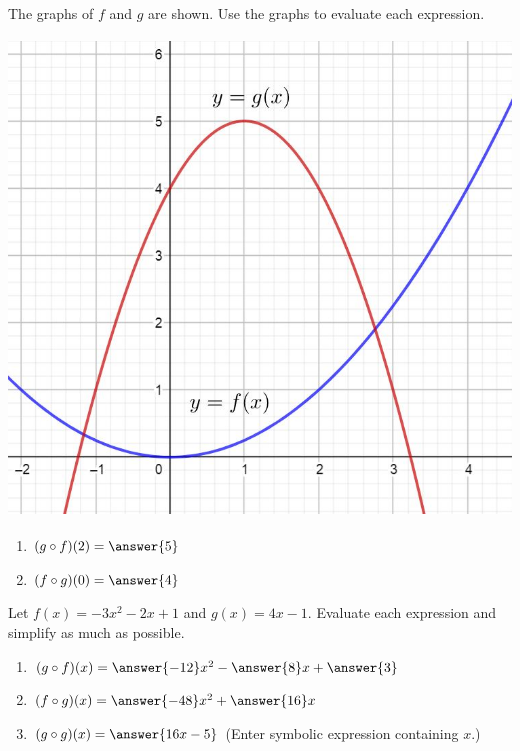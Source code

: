 \documentclass{ximera}
\begin{document}
\begin{problem}\label{prob:160hom2prob7}
The graphs of $f$ and $g$ are shown.  Use the graphs to evaluate each expression.
\begin{image}
   \includegraphics[height=5in]{160H2pic8.jpg}
 \end{image}
  \begin{enumerate}
\item
$(g\circ f)(2)=\answer{5}$

\item
$(f\circ g)(0)=\answer{4}$

  \end{enumerate}
\end{problem}
\begin{problem}\label{prob:160hom2prob8}
Let $f(x)=-3x^2-2x+1$ and $g(x)=4x-1$.  Evaluate each expression and simplify as much as possible.
\begin{enumerate}
    \item $(g\circ f)(x)=\answer{-12}x^2-\answer{8}x+\answer{3}$
    \item $(f\circ g)(x)=\answer{-48}x^2+\answer{16}x$
    \item $(g\circ g)(x)=\answer{16x-5}$ (Enter symbolic expression containing $x$.)
\end{enumerate}
\end{problem}
 
\end{document}
